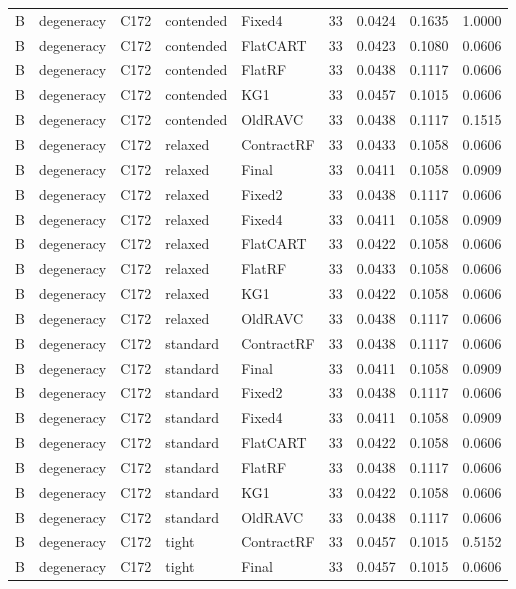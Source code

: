 \begin{longtable}{@{}lllllllll@{}}
B & degeneracy & C172 & contended & Fixed4 & 33 & 0.0424 & 0.1635 & 1.0000\\
B & degeneracy & C172 & contended & FlatCART & 33 & 0.0423 & 0.1080 & 0.0606\\
B & degeneracy & C172 & contended & FlatRF & 33 & 0.0438 & 0.1117 & 0.0606\\
B & degeneracy & C172 & contended & KG1 & 33 & 0.0457 & 0.1015 & 0.0606\\
B & degeneracy & C172 & contended & OldRAVC & 33 & 0.0438 & 0.1117 & 0.1515\\
B & degeneracy & C172 & relaxed & ContractRF & 33 & 0.0433 & 0.1058 & 0.0606\\
B & degeneracy & C172 & relaxed & Final & 33 & 0.0411 & 0.1058 & 0.0909\\
B & degeneracy & C172 & relaxed & Fixed2 & 33 & 0.0438 & 0.1117 & 0.0606\\
B & degeneracy & C172 & relaxed & Fixed4 & 33 & 0.0411 & 0.1058 & 0.0909\\
B & degeneracy & C172 & relaxed & FlatCART & 33 & 0.0422 & 0.1058 & 0.0606\\
B & degeneracy & C172 & relaxed & FlatRF & 33 & 0.0433 & 0.1058 & 0.0606\\
B & degeneracy & C172 & relaxed & KG1 & 33 & 0.0422 & 0.1058 & 0.0606\\
B & degeneracy & C172 & relaxed & OldRAVC & 33 & 0.0438 & 0.1117 & 0.0606\\
B & degeneracy & C172 & standard & ContractRF & 33 & 0.0438 & 0.1117 & 0.0606\\
B & degeneracy & C172 & standard & Final & 33 & 0.0411 & 0.1058 & 0.0909\\
B & degeneracy & C172 & standard & Fixed2 & 33 & 0.0438 & 0.1117 & 0.0606\\
B & degeneracy & C172 & standard & Fixed4 & 33 & 0.0411 & 0.1058 & 0.0909\\
B & degeneracy & C172 & standard & FlatCART & 33 & 0.0422 & 0.1058 & 0.0606\\
B & degeneracy & C172 & standard & FlatRF & 33 & 0.0438 & 0.1117 & 0.0606\\
B & degeneracy & C172 & standard & KG1 & 33 & 0.0422 & 0.1058 & 0.0606\\
B & degeneracy & C172 & standard & OldRAVC & 33 & 0.0438 & 0.1117 & 0.0606\\
B & degeneracy & C172 & tight & ContractRF & 33 & 0.0457 & 0.1015 & 0.5152\\
B & degeneracy & C172 & tight & Final & 33 & 0.0457 & 0.1015 & 0.0606\\

\end{longtable}

